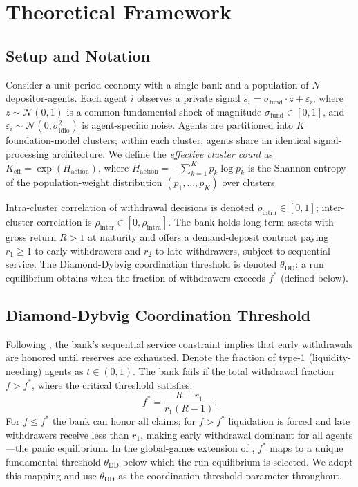 \section{Theoretical Framework}
\label{sec:theory}

\subsection{Setup and Notation}

Consider a unit-period economy with a single bank and a population of $N$ depositor-agents. Each agent $i$ observes a private signal $s_i = \sigma_{\text{fund}} \cdot z + \varepsilon_i$, where $z \sim \mathcal{N}(0,1)$ is a common fundamental shock of magnitude $\sigma_{\text{fund}} \in [0,1]$, and $\varepsilon_i \sim \mathcal{N}(0, \sigma_{\text{idio}}^2)$ is agent-specific noise. Agents are partitioned into $K$ foundation-model clusters; within each cluster, agents share an identical signal-processing architecture. We define the \emph{effective cluster count} as $K_{\text{eff}} = \exp(H_{\text{action}})$, where $H_{\text{action}} = -\sum_{k=1}^{K} p_k \log p_k$ is the Shannon entropy of the population-weight distribution $(p_1, \ldots, p_K)$ over clusters.

Intra-cluster correlation of withdrawal decisions is denoted $\rho_{\text{intra}} \in [0,1]$; inter-cluster correlation is $\rho_{\text{inter}} \in [0, \rho_{\text{intra}}]$. The bank holds long-term assets with gross return $R > 1$ at maturity and offers a demand-deposit contract paying $r_1 \geq 1$ to early withdrawers and $r_2$ to late withdrawers, subject to sequential service. The Diamond-Dybvig coordination threshold is denoted $\theta_{\text{DD}}$: a run equilibrium obtains when the fraction of withdrawers exceeds $f^*$ (defined below).

\subsection{Diamond-Dybvig Coordination Threshold}

Following \citet{diamond1983bank}, the bank's sequential service constraint implies that early withdrawals are honored until reserves are exhausted. Denote the fraction of type-1 (liquidity-needing) agents as $t \in (0,1)$. The bank fails if the total withdrawal fraction $f > f^*$, where the critical threshold satisfies:
\begin{equation}
  f^* = \frac{R - r_1}{r_1(R - 1)}.
  \label{eq:dd-threshold}
\end{equation}
For $f \leq f^*$ the bank can honor all claims; for $f > f^*$ liquidation is forced and late withdrawers receive less than $r_1$, making early withdrawal dominant for all agents---the panic equilibrium. In the global-games extension of \citet{goldstein2005demand}, $f^*$ maps to a unique fundamental threshold $\theta_{\text{DD}}$ below which the run equilibrium is selected. We adopt this mapping and use $\theta_{\text{DD}}$ as the coordination threshold parameter throughout.

